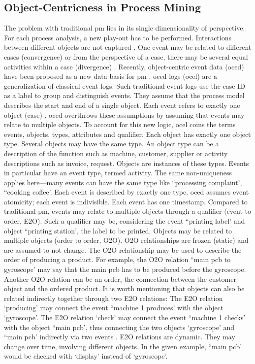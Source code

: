 \subsection{Object-Centricness in Process Mining}
\label{sec:object-centric-event-logs}

The problem with traditional \gls{pm} lies in its single dimensionality of perspective. For each process analysis, a new play-out has to be performed. Interactions between different objects are not captured \autocite{van2023object}. One event may be related to different cases (convergence) or from the perspective of a case, there may be several equal activities within a case (divergence) \autocite{van2019object}.
Recently, object-centric event data (\gls{oced}) have been proposed as a new data basis for \gls{pm} \autocite{van2019object}. \gls{oced} logs (\gls{ocel}) are a generalization of classical event logs. Such traditional event logs use the case ID as a label to group and distinguish events. They assume that the process model describes the start and end of a single object. Each event refers to exactly one object (case) \autocite{van2023object}. \gls{oced} overthrows these assumptions by assuming that events may relate to multiple objects. To account for this new logic, \gls{ocel} coins the terms events, objects, types, attributes and qualifier. Each object has exactly one object type. Several objects may have the same type. An object type can be a description of the function such as machine, customer, supplier or activity descriptions such as invoice, request. Objects are instances of these types. Events in particular have an event type, termed activity. The same non-uniqueness applies here—many events can have the same type like ``processing complaint', ``cooking coffee'. Each event is described by exactly one type. \gls{oced} assumes event atomicity; each event is indivisible. Each event has one timestamp. Compared to traditional \gls{pm}, events may relate to multiple objects through a qualifier (event to order, E2O). Such a qualifier may be, considering the event ``printing label' and object ``printing station', the label to be printed. Objects may be related to multiple objects (order to order, O2O). O2O relationships are frozen (static) and are assumed to not change. The O2O relationship may be used to describe the order of producing a product. For example, the O2O relation ``main pcb to gyroscope' may say that the main pcb has to be produced before the gyroscope. Another O2O relation can be an order, the connection between the customer object and the ordered product. It is worth mentioning that objects can also be related indirectly together through two E2O relations: The E2O relation `producing' may connect the event ``machine 1 produces' with the object `gyroscope'. The E2O relation `check' may connect the event ``machine 1 checks' with the object ``main pcb', thus connecting the two objects `gyroscope' and ``main pcb' indirectly via two events \autocite{van2019object}. E2O relations are dynamic. They may change over time, involving different objects. In the given example, ``main pcb' would be checked with `display' instead of `gyroscope'.

